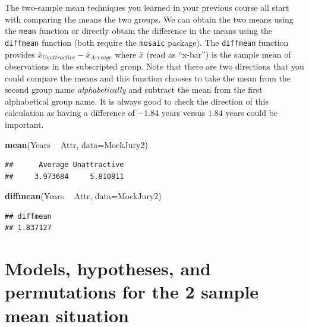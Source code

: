 \documentclass[]{book}
\newenvironment{Shaded}{\begin{snugshade}}{\end{snugshade}}
\newcommand{\KeywordTok}[1]{\textcolor[rgb]{0.13,0.29,0.53}{\textbf{#1}}}
\newcommand{\DataTypeTok}[1]{\textcolor[rgb]{0.13,0.29,0.53}{#1}}
\newcommand{\StringTok}[1]{\textcolor[rgb]{0.31,0.60,0.02}{#1}}
\newcommand{\OperatorTok}[1]{\textcolor[rgb]{0.81,0.36,0.00}{\textbf{#1}}}
\newcommand{\NormalTok}[1]{#1}
\theoremstyle{definition}
\theoremstyle{definition}
\theoremstyle{remark}
\begin{document}
The two-sample mean techniques you learned in your previous course all
start with comparing the means the two groups. We can obtain the two
means using the \texttt{mean} function or directly obtain the difference
in the means using the \texttt{diffmean} function (both require the
\texttt{mosaic} package). The \texttt{diffmean} function provides
\(\bar{x}_{Unattractive} - \bar{x}_{Average}\) where \(\bar{x}\) (read
as ``x-bar'') is the sample mean of observations in the subscripted
group. Note that there are two directions that you could compare the
means and this function chooses to take the mean from the second group
name \emph{alphabetically} and subtract the mean from the first
alphabetical group name. It is always good to check the direction of
this calculation as having a difference of \(-1.84\) years versus
\(1.84\) years could be important.

\begin{Shaded}
\begin{Highlighting}[]
\KeywordTok{mean}\NormalTok{(Years }\OperatorTok{~}\StringTok{ }\NormalTok{Attr, }\DataTypeTok{data=}\NormalTok{MockJury2)}
\end{Highlighting}
\end{Shaded}

\begin{verbatim}
##      Average Unattractive 
##     3.973684     5.810811
\end{verbatim}

\begin{Shaded}
\begin{Highlighting}[]
\KeywordTok{diffmean}\NormalTok{(Years }\OperatorTok{~}\StringTok{ }\NormalTok{Attr, }\DataTypeTok{data=}\NormalTok{MockJury2)}
\end{Highlighting}
\end{Shaded}

\begin{verbatim}
## diffmean 
## 1.837127
\end{verbatim}

\section{Models, hypotheses, and permutations for the 2 sample mean
situation}\label{section2-3}
\end{document}
